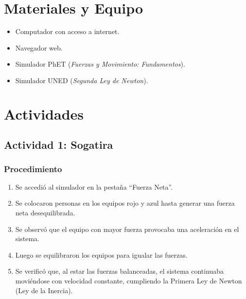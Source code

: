 \documentclass[11pt,a4paper]{article}
\begin{document}
\section{Materiales y Equipo}
\begin{itemize}
    \item Computador con acceso a internet.
    \item Navegador web.
    \item Simulador PhET (\textit{Fuerzas y Movimiento: Fundamentos}).
    \item Simulador UNED (\textit{Segunda Ley de Newton}).
\end{itemize}

\section{Actividades}

\subsection{Actividad 1: Sogatira}
\subsubsection{Procedimiento}
\begin{enumerate}
    \item Se accedió al simulador en la pestaña ``Fuerza Neta''.
    \item Se colocaron personas en los equipos rojo y azul hasta generar una fuerza neta desequilibrada.
    \item Se observó que el equipo con mayor fuerza provocaba una aceleración en el sistema.
    \item Luego se equilibraron los equipos para igualar las fuerzas.
    \item Se verificó que, al estar las fuerzas balanceadas, el sistema continuaba moviéndose con velocidad constante, cumpliendo la Primera Ley de Newton (Ley de la Inercia).
\end{enumerate}
\end{document}
